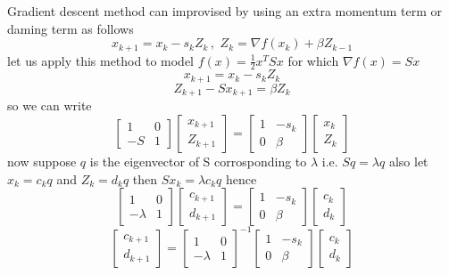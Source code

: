\documentclass[a4paper]{article}
\numberwithin{equation}{section}
\begin{document}
\begin{itemize}
Gradient descent method can improvised by using an extra momentum term or daming term as follows
\[\boxed{x_{k+1}=x_k-s_kZ_k \hspace{2pt},\hspace{4pt} Z_k=\nabla f(x_k)+\beta Z_{k-1}}\] 
let us apply this method to model $f(x)=\frac{1}{2}x^TSx$ for which $\nabla f(x)=Sx$
\[x_{k+1}=x_k-s_kZ_k\]
\[Z_{k+1}-Sx_{k+1}=\beta Z_k\]
so we can write
\[
\begin{bmatrix}
    1&0\\-S&1
\end{bmatrix}
\begin{bmatrix}
    x_{k+1}\\Z_{k+1}
\end{bmatrix}=
\begin{bmatrix}
    1&-s_k\\0&\beta
\end{bmatrix}
\begin{bmatrix}
    x_{k}\\Z_{k}
\end{bmatrix}
\]
now suppose $q$ is the eigenvector of S corrosponding to $\lambda$ i.e. $Sq=\lambda q$ also let $x_{k}=c_kq$ and $Z_k=d_kq$ then $Sx_k=\lambda c_k q$ hence
\[\begin{bmatrix}
    1&0\\-\lambda&1
\end{bmatrix}
\begin{bmatrix}
    c_{k+1}\\d_{k+1}
\end{bmatrix}=
\begin{bmatrix}
    1&-s_k\\0&\beta
\end{bmatrix}
\begin{bmatrix}
    c_{k}\\d_{k}
\end{bmatrix}\]
\[
\begin{bmatrix}
    c_{k+1}\\d_{k+1}
\end{bmatrix}=
\begin{bmatrix}
    1&0\\-\lambda&1
\end{bmatrix}^{-1}
\begin{bmatrix}
    1&-s_k\\0&\beta
\end{bmatrix}
\begin{bmatrix}
    c_{k}\\d_{k}
\end{bmatrix}
\]
\end{itemize}
\end{document}
